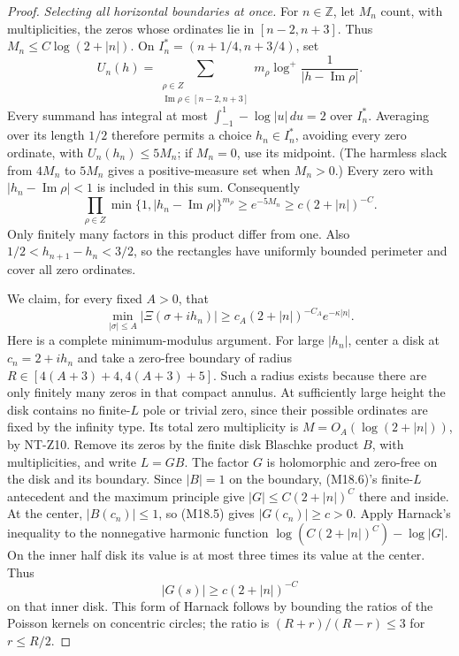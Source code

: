 \documentclass[11pt,a4paper]{article}
\begin{document}
\begin{proof}
\emph{Selecting all horizontal boundaries at once.}
For \(n\in\mathbb Z\), let \(M_n\) count, with multiplicities,
the zeros whose ordinates lie in \([n-2,n+3]\).  Thus
\(M_n\le C\log(2+|n|)\).  On
\(I_n^*=(n+1/4,n+3/4)\), set
\[
 U_n(h)=\sum_{\substack{\rho\in Z\\
                    \operatorname{Im}\rho\in[n-2,n+3]}}
       m_\rho\log^+\frac1{|h-\operatorname{Im}\rho|}.
\]
Every summand has integral at most
\(\int_{-1}^1-\log|u|\,du=2\) over \(I_n^*\).
Averaging over its length \(1/2\) therefore permits a
choice \(h_n\in I_n^*\), avoiding every zero ordinate,
with \(U_n(h_n)\le 5M_n\); if \(M_n=0\), use its midpoint.
(The harmless slack from \(4M_n\) to \(5M_n\) gives a
positive-measure set when \(M_n>0\).)
Every zero with \(|h_n-\operatorname{Im}\rho|<1\)
is included in this sum.  Consequently
\[
 \prod_{\rho\in Z}
   \min\{1,|h_n-\operatorname{Im}\rho|\}^{m_\rho}
      \ge e^{-5M_n}\ge c(2+|n|)^{-C}.                            \tag{M18.7}
\]
Only finitely many factors in this product differ from one.
Also \(1/2<h_{n+1}-h_n<3/2\), so the rectangles have
uniformly bounded perimeter and cover all zero ordinates.

We claim, for every fixed \(A>0\), that
\[
 \min_{|\sigma|\le A}|\Xi(\sigma+i h_n)|
       \ge c_A(2+|n|)^{-C_A}e^{-\kappa|n|}.                      \tag{M18.8}
\]
Here is a complete minimum-modulus argument.  For large
\(|h_n|\), center a disk at \(c_n=2+i h_n\) and take a
zero-free boundary of radius
\(R\in[4(A+3)+4,4(A+3)+5]\).  Such a radius exists because
there are only finitely many zeros in that compact annulus.
At sufficiently large height the disk contains no finite-\(L\)
pole or trivial zero, since their possible ordinates are fixed
by the infinity type.  Its total zero multiplicity is
\(M=O_A(\log(2+|n|))\), by NT-Z10.  Remove its zeros by the
finite disk Blaschke product \(B\), with multiplicities,
and write \(L=GB\).  The factor \(G\) is holomorphic and
zero-free on the disk and its boundary.  Since \(|B|=1\)
on the boundary, (M18.6)'s finite-\(L\) antecedent and the
maximum principle give \(|G|\le C(2+|n|)^C\) there and
inside.  At the center, \(|B(c_n)|\le1\), so (M18.5)
gives \(|G(c_n)|\ge c>0\).
Apply Harnack's inequality to the nonnegative harmonic
function \(\log(C(2+|n|)^C)-\log|G|\).  On the inner
half disk its value is at most three times its value
at the center.  Thus
\[
                        |G(s)|\ge c(2+|n|)^{-C}
\]
on that inner disk.  This form of Harnack follows by
bounding the ratios of the Poisson kernels on concentric
circles; the ratio is \((R+r)/(R-r)\le3\) for \(r\le R/2\).


\end{proof}
\end{document}
